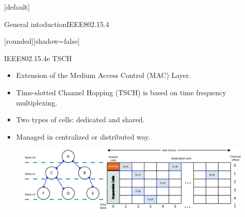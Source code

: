 \documentclass{beamer}
\makeatletter
\newenvironment{withoutheadline}{
        \setbeamertemplate{headline}[default]
        \def\beamer@entrycode{\vspace*{-\headheight}}
    }{}
\makeatother
\begin{document}
\begin{withoutheadline}
\begin{frame}{General intoduction}{IEEE802.15.4}

[rounded][shadow=false]




\begin{block}{IEEE802.15.4e TSCH}
    \begin{itemize}
    \item Extension of the Medium Access Control (MAC) Layer.
    \item<2-> Time-slotted Channel Hopping (TSCH) is based on time frequency multiplexing. 
    \item<3-> Two types of cells: dedicated and shared.
    \item<4-> Managed in centralized or distributed way. 
    
    \end{itemize}
    \end{block}

\centering
\begin{figure}[p]

\includegraphics[width=\linewidth]{TSCh.jpeg}
\end{figure}


\end{frame}
\end{withoutheadline}
\end{document}
